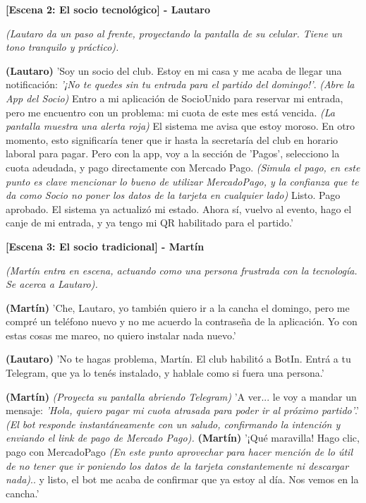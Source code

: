 \vspace{1cm}

\textbf{[Escena 2: El socio tecnológico] - Lautaro}

\textit{(Lautaro da un paso al frente, proyectando la pantalla de su celular. Tiene un tono tranquilo y práctico).}

\textbf{(Lautaro)}
'Soy un socio del club. Estoy en mi casa y me acaba de llegar una notificación: \textit{'¡No te quedes sin tu entrada para el partido del domingo!'}. 
\textit{(Abre la App del Socio)}
Entro a mi aplicación de SocioUnido para reservar mi entrada, pero me encuentro con un problema: mi cuota de este mes está vencida. 
\textit{(La pantalla muestra una alerta roja)}
El sistema me avisa que estoy moroso. En otro momento, esto significaría tener que ir hasta la secretaría del club en horario laboral para pagar. Pero con la app, voy a la sección de 'Pagos', selecciono la cuota adeudada, y pago directamente con Mercado Pago.
\textit{(Simula el pago, en este punto es clave mencionar lo bueno de utilizar MercadoPago, y la confianza que te da como Socio no poner los datos de la tarjeta en cualquier lado)}
Listo. Pago aprobado. El sistema ya actualizó mi estado. Ahora sí, vuelvo al evento, hago el canje de mi entrada, y ya tengo mi QR habilitado para el partido.'

\vspace{1cm}

\textbf{[Escena 3: El socio tradicional] - Martín}

\textit{(Martín entra en escena, actuando como una persona frustrada con la tecnología. Se acerca a Lautaro).}

\textbf{(Martín)}
'Che, Lautaro, yo también quiero ir a la cancha el domingo, pero me compré un teléfono nuevo y no me acuerdo la contraseña de la aplicación. Yo con estas cosas me mareo, no quiero instalar nada nuevo.'

\textbf{(Lautaro)}
'No te hagas problema, Martín. El club habilitó a BotIn. Entrá a tu Telegram, que ya lo tenés instalado, y hablale como si fuera una persona.'

\textbf{(Martín)}
\textit{(Proyecta su pantalla abriendo Telegram)}
'A ver... le voy a mandar un mensaje: \textit{'Hola, quiero pagar mi cuota atrasada para poder ir al próximo partido'}.'
\textit{(El bot responde instantáneamente con un saludo, confirmando la intención y enviando el link de pago de Mercado Pago).}
\textbf{(Martín)}
'¡Qué maravilla! Hago clic, pago con MercadoPago \textit{(En este punto aprovechar para hacer mención de lo útil de no tener que ir poniendo los datos de la tarjeta constantemente ni descargar nada)}.. y listo, el bot me acaba de confirmar que ya estoy al día. Nos vemos en la cancha.'

